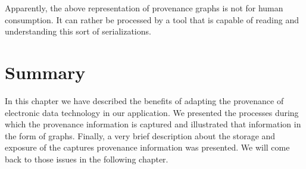 Apparently, the above representation of provenance graphs is not for human consumption. It can rather be processed by a tool that is capable of reading and understanding this sort of serializations.

\section{Summary}

In this chapter we have described the benefits of adapting the provenance of electronic data technology in our application. We presented the processes during which the provenance information is captured and illustrated that information in the form of graphs. Finally, a very brief description about the storage and exposure of the captures provenance information was presented. We will come back to those issues in the following chapter. 